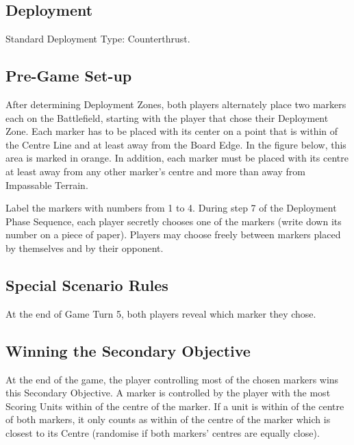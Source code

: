
\label{Misdirections}


\subsection*{Deployment}

Standard Deployment Type: Counterthrust.

\subsection*{Pre-Game Set-up}

After determining Deployment Zones, both players alternately place two markers each on the Battlefield, starting with the player that chose their Deployment Zone. Each marker has to be placed with its center on a point that is within  of the Centre Line and at least  away from the Board Edge. In the figure below, this area is marked in orange. In addition, each marker must be placed with its centre at least  away from any other marker's centre and more than  away from Impassable Terrain.

Label the markers with numbers from 1 to 4. During step 7 of the Deployment Phase Sequence, each player secretly chooses one of the markers (write down its number on a piece of paper). Players may choose freely between markers placed by themselves and by their opponent.


\subsection*{Special Scenario Rules}

At the end of Game Turn 5, both players reveal which marker they chose. 

\subsection*{Winning the Secondary Objective}

At the end of the game, the player controlling most of the chosen markers wins this Secondary Objective. A marker is controlled by the player with the most Scoring Units within  of the centre of the marker. If a unit is within  of the centre of both markers, it only counts as within  of the centre of the marker which is closest to its Centre (randomise if both markers' centres are equally close).
